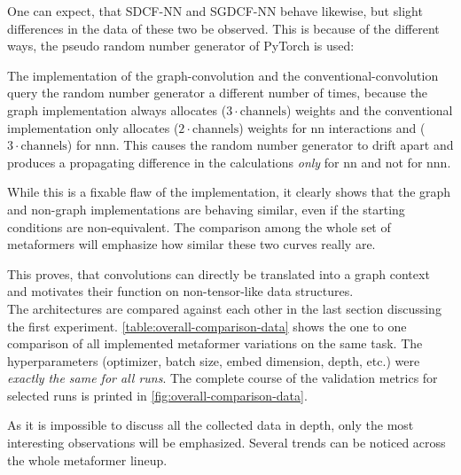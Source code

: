 One can expect, that SDCF-NN and SGDCF-NN behave likewise, but slight differences in the data of these two be observed.
This is because of the different ways, the pseudo random number generator of PyTorch is used:
\begin{sloppypar} %
    The implementation of the graph-convolution \phantom{asdasdasdasdasdasdasdasdasdasdasdasdasd}
    and the conventional-convolution 
        \phantom{aa}
        query the random number generator a different number of times, because the graph implementation always allocates ($3 \cdot \mathrm{channels}$) weights and the conventional implementation only allocates ($2 \cdot \mathrm{channels}$) weights for nn interactions and ($3 \cdot \mathrm{channels}$) for nnn.
        This causes the random number generator to drift apart and produces a propagating difference in the calculations \emph{only} for nn and not for nnn.
\end{sloppypar}

While this is a fixable flaw of the implementation, it clearly shows that the graph and non-graph implementations are behaving similar, even if the starting conditions are non-equivalent.
The comparison among the whole set of metaformers will emphasize how similar these two curves really are.

This proves, that convolutions can directly be translated into a graph context and motivates their function on non-tensor-like data structures.\\

\FloatBarrier
The architectures are compared against each other in the last section discussing the first experiment. 
\autoref{table:overall-comparison-data} shows the one to one comparison of all implemented metaformer variations on the same task.
The hyperparameters (optimizer, batch size, embed dimension, depth, etc.) were \emph{exactly the same for all runs}. 
The complete course of the validation metrics for selected runs is printed in \autoref{fig:overall-comparison-data}.

As it is impossible to discuss all the collected data in depth, only the most interesting observations will be emphasized.
Several trends can be noticed across the whole metaformer lineup. 


